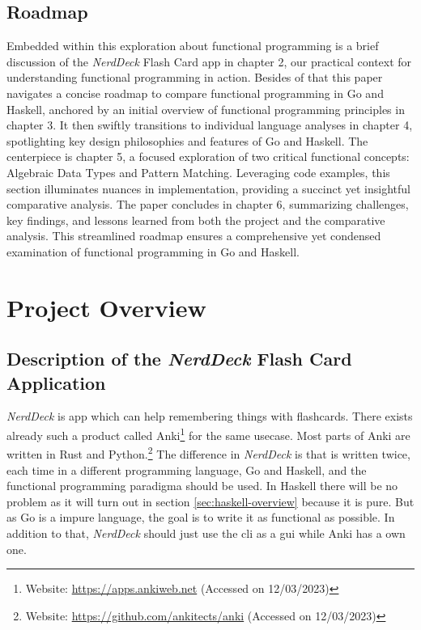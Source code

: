     \section{Roadmap}\label{sec:roadmap}
    Embedded within this exploration about functional programming is a brief discussion of the \textit{NerdDeck} Flash Card \ac{app} in chapter 2, our practical context for understanding functional programming in action. Besides of that this paper navigates a concise roadmap to compare functional programming in Go and Haskell, anchored by an initial overview of functional programming principles in chapter 3. It then swiftly transitions to individual language analyses in chapter 4, spotlighting key design philosophies and features of Go and Haskell. The centerpiece is chapter 5, a focused exploration of two critical functional concepts: Algebraic Data Types and Pattern Matching. Leveraging code examples, this section illuminates nuances in implementation, providing a succinct yet insightful comparative analysis. The paper concludes in chapter 6, summarizing challenges, key findings, and lessons learned from both the project and the comparative analysis. This streamlined roadmap ensures a comprehensive yet condensed examination of functional programming in Go and Haskell.

\chapter{Project Overview}\label{chap:project-overview}
    \section{Description of the \textit{NerdDeck} Flash Card Application}\label{sec:description}
    \textit{NerdDeck} is app which can help remembering things with flashcards. There exists already such a product called Anki\footnote{Website: \url{https://apps.ankiweb.net} (Accessed on 12/03/2023)} for the same usecase. Most parts of Anki are written in Rust and Python.\footnote{Website: \url{https://github.com/ankitects/anki} (Accessed on 12/03/2023)} The difference in \textit{NerdDeck} is that is written twice, each time in a different programming language, Go and Haskell, and the functional programming paradigma should be used. In Haskell there will be no problem as it will turn out in section \ref{sec:haskell-overview} because it is pure. But as Go is a impure language, the goal is to write it as functional as possible. In addition to that, \textit{NerdDeck} should just use the \ac{cli} as a \ac{gui} while Anki has a own one.

